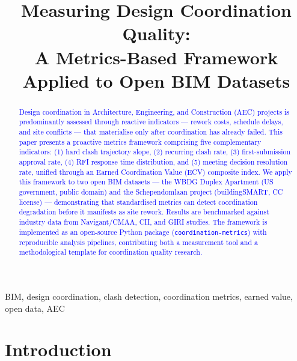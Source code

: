 \documentclass[conference]{IEEEtran}
\title{Measuring Design Coordination Quality: \\A Metrics-Based Framework Applied to Open BIM Datasets}
\author{
\IEEEauthorblockN{Houssame E. Hsain}
\IEEEauthorblockA{School of Built Environment\\
University of New South Wales\\
Sydney, Australia\\
h.hsain@unsw.edu.au}
}
\newcommand{\placeholder}[1]{\textcolor{blue}{#1}}
\begin{document}
\maketitle

\begin{abstract}
\placeholder{
Design coordination in Architecture, Engineering, and Construction (AEC) projects is predominantly assessed through reactive indicators --- rework costs, schedule delays, and site conflicts --- that materialise only after coordination has already failed. This paper presents a proactive metrics framework comprising five complementary indicators: (1) hard clash trajectory slope, (2) recurring clash rate, (3) first-submission approval rate, (4) RFI response time distribution, and (5) meeting decision resolution rate, unified through an Earned Coordination Value (ECV) composite index. We apply this framework to two open BIM datasets --- the WBDG Duplex Apartment (US government, public domain) and the Schependomlaan project (buildingSMART, CC license) --- demonstrating that standardised metrics can detect coordination degradation before it manifests as site rework. Results are benchmarked against industry data from Navigant/CMAA, CII, and GIRI studies. The framework is implemented as an open-source Python package (\texttt{coordination-metrics}) with reproducible analysis pipelines, contributing both a measurement tool and a methodological template for coordination quality research.
}
\end{abstract}

\begin{IEEEkeywords}
BIM, design coordination, clash detection, coordination metrics, earned value, open data, AEC
\end{IEEEkeywords}

\section{Introduction}
\end{document}
